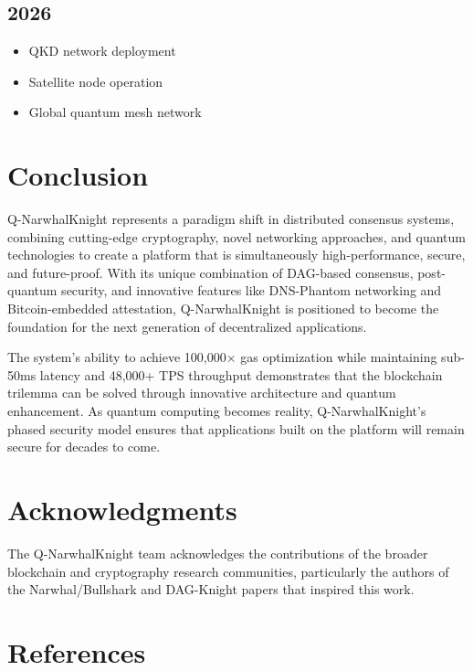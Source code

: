 \documentclass[11pt,a4paper]{article}
\begin{document}
\subsection{2026}
\begin{itemize}
    \item QKD network deployment
    \item Satellite node operation
    \item Global quantum mesh network
\end{itemize}

\section{Conclusion}

Q-NarwhalKnight represents a paradigm shift in distributed consensus systems, combining cutting-edge cryptography, novel networking approaches, and quantum technologies to create a platform that is simultaneously high-performance, secure, and future-proof. With its unique combination of DAG-based consensus, post-quantum security, and innovative features like DNS-Phantom networking and Bitcoin-embedded attestation, Q-NarwhalKnight is positioned to become the foundation for the next generation of decentralized applications.

The system's ability to achieve 100,000× gas optimization while maintaining sub-50ms latency and 48,000+ TPS throughput demonstrates that the blockchain trilemma can be solved through innovative architecture and quantum enhancement. As quantum computing becomes reality, Q-NarwhalKnight's phased security model ensures that applications built on the platform will remain secure for decades to come.

\section*{Acknowledgments}

The Q-NarwhalKnight team acknowledges the contributions of the broader blockchain and cryptography research communities, particularly the authors of the Narwhal/Bullshark and DAG-Knight papers that inspired this work.

\section*{References}
\end{document}
